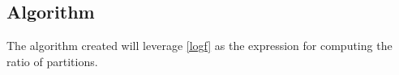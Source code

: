 \documentclass[10pt,letterpaper]{article}
\begin{document}
\newpage
\subsection{Algorithm}

The algorithm created will leverage \ref{logf} as the expression for computing the ratio of partitions.






\end{document}
